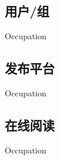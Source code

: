 
\subsection{用户/组}
\indent
Occupation

\subsection{发布平台}
\indent
Occupation

\subsection{在线阅读}
\indent
Occupation


\clearpage